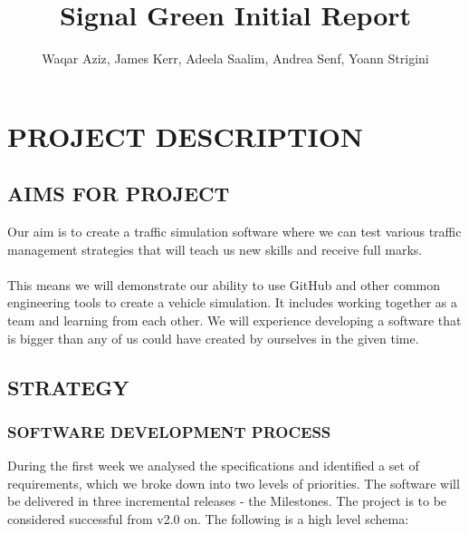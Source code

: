 \documentclass[11pt]{article}
\begin{document}
\title{Signal Green Initial Report}

\author{Waqar Aziz, James Kerr, Adeela Saalim, Andrea Senf, Yoann Strigini}

\maketitle 


\section{PROJECT DESCRIPTION}


\subsection{AIMS FOR PROJECT}

Our aim is to create a traffic simulation software where we can test various traffic management strategies that will teach us new skills and receive full marks. 
\\ \\
This means we will demonstrate our ability to use GitHub and other common engineering tools to create a vehicle simulation. It includes working together as a team and learning from each other. We will experience developing a software that is bigger than any of us could have created by ourselves in the given time. 


\subsection{STRATEGY}

\subsubsection{SOFTWARE DEVELOPMENT PROCESS}

During the first week we analysed the specifications and identified a set of requirements, which we broke down into two levels of priorities. The software will be delivered in three incremental releases - the Milestones. The project is to be considered successful from v2.0 on. The following is a high level schema:
\end{document}
